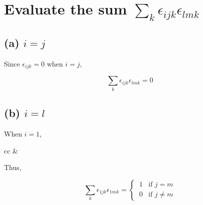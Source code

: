 \documentclass[a4paper]{article}
\begin{document}
\Large

\section{Evaluate the sum $\sum\limits_{k}\epsilon_{ijk}\epsilon_{lmk} $}

\subsection*{(a) $i = j$}

Since $\epsilon_{ijk} = 0$ when $i = j$,

\begin{equation*}
	\sum_k \epsilon_{ijk}\epsilon_{lmk} = 0
\end{equation*}

\subsection*{(b) $i = l$}

When $i = 1$, 

\begin{center}
	\begin{tabular}{cc}
	&
	\end{tabular}
	\vspace*{1 cm}
\end{center}

Thus, 

\begin{equation*}
	\sum_k \epsilon_{1jk}\epsilon_{1mk} = 
	\begin{cases}
	  	\ 1 & \text{if } j = m \\
	    \ 0 & \text{if } j \neq m
	  \end{cases}
\end{equation*}
\\
\end{document}
